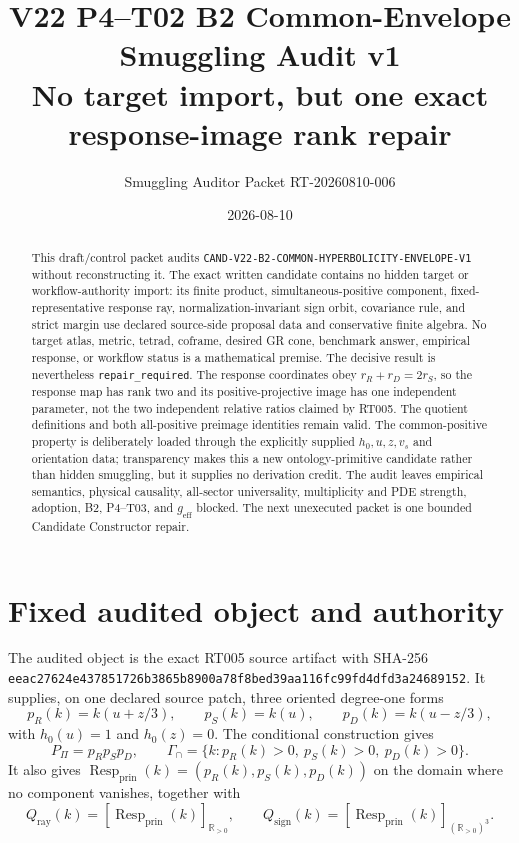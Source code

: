 \documentclass[11pt]{article}
\title{V22 P4--T02 B2 Common-Envelope Smuggling Audit v1\\
\large No target import, but one exact response-image rank repair}
\author{Smuggling Auditor Packet RT-20260810-006}
\date{2026-08-10}
\newcommand{\RR}{\mathbb R}
\newcommand{\Resp}{\operatorname{Resp}_{\mathrm{prin}}}
\newcommand{\Qray}{Q_{\mathrm{ray}}}
\newcommand{\Qsign}{Q_{\mathrm{sign}}}
\newcommand{\GammaInt}{\Gamma_{\cap}}
\begin{document}
\sloppy
\maketitle

\begin{abstract}
This draft/control packet audits
\texttt{CAND-V22-B2-COMMON-HYPERBOLICITY-ENVELOPE-V1} without
reconstructing it.  The exact written candidate contains no hidden target or
workflow-authority import: its finite product, simultaneous-positive component,
fixed-representative response ray, normalization-invariant sign orbit,
covariance rule, and strict margin use declared source-side proposal data and
conservative finite algebra.
No target atlas, metric, tetrad, coframe, desired GR cone, benchmark answer,
empirical response, or workflow status is a mathematical premise.  The decisive
result is nevertheless \texttt{repair\_required}.  The response coordinates
obey $r_R+r_D=2r_S$, so the response map has rank two and its positive-projective
image has one independent parameter, not the two independent relative ratios
claimed by RT005.  The quotient definitions and both all-positive preimage
identities remain valid.
The common-positive property is deliberately loaded through the explicitly
supplied $h_0,u,z,v_s$ and orientation data; transparency makes this a new
ontology-primitive candidate rather than hidden smuggling, but it supplies no
derivation credit.  The audit leaves empirical semantics, physical causality,
all-sector universality, multiplicity and PDE strength, adoption, B2, P4--T03,
and $g_{\mathrm{eff}}$ blocked.  The next unexecuted packet is one bounded
Candidate Constructor repair.
\end{abstract}

\section{Fixed audited object and authority}

The audited object is the exact RT005 source artifact with SHA-256
\texttt{eeac27624e437851726b3865b8900a78f8bed39aa116fc99fd4dfd3a24689152}.
It supplies, on one declared source patch, three oriented degree-one forms
\[
 p_R(k)=k(u+z/3),\qquad p_S(k)=k(u),\qquad
 p_D(k)=k(u-z/3),
\]
with $h_0(u)=1$ and $h_0(z)=0$.  The conditional construction gives
\[
 P_\Pi=p_Rp_Sp_D,
 \qquad
 \GammaInt=\{k:p_R(k)>0,\ p_S(k)>0,\ p_D(k)>0\}.
\]
It also gives $\Resp(k)=(p_R(k),p_S(k),p_D(k))$ on the domain where no
component vanishes, together with
\[
 \Qray(k)=[\Resp(k)]_{\RR_{>0}},\qquad
 \Qsign(k)=[\Resp(k)]_{(\RR_{>0})^3}.
\]
\end{document}
